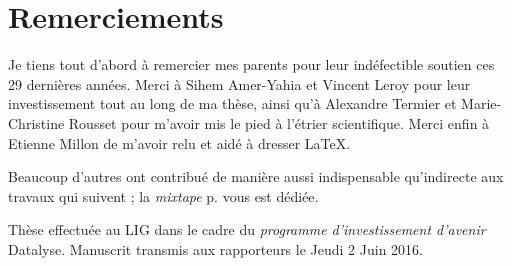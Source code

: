 \section*{Remerciements}


Je tiens tout d'abord à remercier mes parents pour leur indéfectible soutien ces 29 dernières années.
Merci à Sihem Amer-Yahia et Vincent Leroy pour leur investissement tout au long de ma thèse,
ainsi qu'à Alexandre Termier et Marie-Christine Rousset pour m'avoir mis le pied à l'étrier scientifique.
Merci enfin à Etienne Millon de m'avoir relu et aidé à dresser \LaTeX.

\noindent
Beaucoup d'autres ont contribué de manière aussi indispensable qu'indirecte aux travaux qui suivent ;
la \textit{mixtape} p.\pageref{chap:discography} vous est dédiée.


\vfill

\begin{paragraph}{}\noindent
  Th\`ese effectu\'ee au LIG dans le cadre du \textit{programme d'investissement d'avenir} Datalyse.
  Manuscrit transmis aux rapporteurs le Jeudi 2 Juin 2016.
\end{paragraph}
